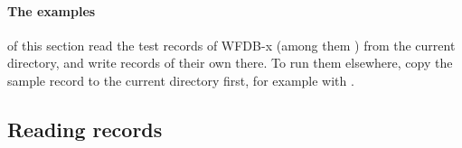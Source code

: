 \paragraph{The examples} of this section read the test records of WFDB-x (among them
) from the current directory, and write records of their own there. To run
them elsewhere, copy the sample record to the current directory first, for example with
.

\subsection{Reading records}
\label{sec:python-reading}

